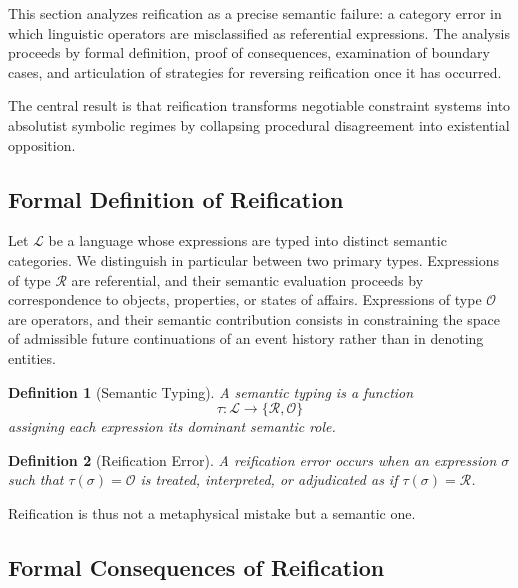 \documentclass[11pt]{article}
\newtheorem{definition}{Definition}
\newcommand{\Lang}{\mathcal{L}}
\begin{document}
This section analyzes reification as a precise semantic failure: a category error
in which linguistic operators are misclassified as referential expressions. The
analysis proceeds by formal definition, proof of consequences, examination of
boundary cases, and articulation of strategies for reversing reification once it
has occurred.

The central result is that reification transforms negotiable constraint systems
into absolutist symbolic regimes by collapsing procedural disagreement into
existential opposition.

\subsection{Formal Definition of Reification}

Let $\Lang$ be a language whose expressions are typed into distinct semantic
categories. We distinguish in particular between two primary types. Expressions
of type $\mathcal{R}$ are referential, and their semantic evaluation proceeds by
correspondence to objects, properties, or states of affairs. Expressions of type
$\mathcal{O}$ are operators, and their semantic contribution consists in
constraining the space of admissible future continuations of an event history
rather than in denoting entities.


\begin{definition}[Semantic Typing]
A semantic typing is a function
\[
\tau : \Lang \to \{\mathcal{R}, \mathcal{O}\}
\]
assigning each expression its dominant semantic role.
\end{definition}

\begin{definition}[Reification Error]
A reification error occurs when an expression $\sigma$ such that
$\tau(\sigma) = \mathcal{O}$ is treated, interpreted, or adjudicated as if
$\tau(\sigma) = \mathcal{R}$.
\end{definition}

Reification is thus not a metaphysical mistake but a semantic one.

\subsection{Formal Consequences of Reification}
\end{document}
